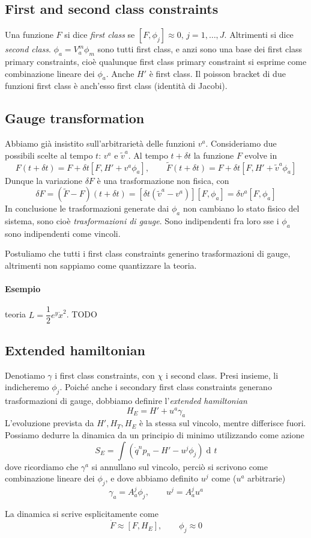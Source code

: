\documentclass[a4paper, 11pt]{article}
\newcommand{\dd}{\mathop{\mathrm{d}\!}{}}
\begin{document}
	\subsection{First and second class constraints}
	Una funzione $F$ si dice \emph{first class} se $[F, \phi_j] \approx 0,\, j=1,\dots,J$. Altrimenti si dice \emph{second class}.
	$\phi_a=V_a^m\phi_m$ sono tutti first class, e anzi sono una base dei first class primary constraints, cioè qualunque first class primary constraint si esprime come combinazione lineare dei $\phi_a$. Anche $H'$ è first class. Il poisson bracket di due funzioni first class è anch'esso first class (identità di Jacobi).
	
	\subsection{Gauge transformation}
	Abbiamo già insistito sull'arbitrarietà delle funzioni $v^a$. Consideriamo due possibili scelte al tempo $t$: $v^a$ e $\tilde{v}^a$. Al tempo $t+\delta t$ la funzione $F$ evolve in
	\[ F(t+\delta t) = F + \delta t [F, H'+v^a\phi_a],\qquad \tilde{F}(t+\delta t) = F + \delta t [F, H'+\tilde{v}^a\phi_a] \]
	Dunque la variazione $\delta F$ è una trasformazione non fisica, con
	\[ \delta F = (\tilde{F}-F)(t+\delta t) = [\delta t (\tilde{v}^a - v^a)] [F, \phi_a] = \delta v^a [F, \phi_a]\]
	In conclusione le trasformazioni generate dai $\phi_a$ non cambiano lo stato fisico del sistema, sono cioè \emph{trasformazioni di gauge}.
	Sono indipendenti fra loro sse i $\phi_a$ sono indipendenti come vincoli.
	
	Postuliamo che tutti i first class constraints generino trasformazioni di gauge, altrimenti non sappiamo come quantizzare la teoria.
	\paragraph{Esempio} teoria $L = \dfrac{1}{2} e^y \dot{x}^2$. TODO
	
	\subsection{Extended hamiltonian}
	Denotiamo $\gamma$ i first class constraints, con $\chi$ i second class. Presi insieme, li indicheremo $\phi_j$.
	Poiché anche i secondary first class constraints generano trasformazioni di gauge, dobbiamo definire l'\emph{extended hamiltonian}
	\[ H_E = H' + u^a \gamma_a \]
	L'evoluzione prevista da $H',H_T,H_E$ è la stessa sul vincolo, mentre differisce fuori. Possiamo dedurre la dinamica da un principio di minimo utilizzando come azione
	\[ S_E = \int (\dot{q}^n p_n - H' - u^j \phi_j) \dd t \]
	dove ricordiamo che $\gamma^a$ si annullano sul vincolo, perciò si scrivono come combinazione lineare dei $\phi_j$, e dove abbiamo definito $u^j$ come ($u^a$ arbitrarie)
	\[ \gamma_a = A_a^j \phi_j,\qquad u^j = A_a^j u^a \]
	
	La dinamica si scrive esplicitamente come
	\[ \dot{F} \approx [F, H_E],\qquad \phi_j \approx 0 \]
	
	
	\newpage
	
\end{document}
